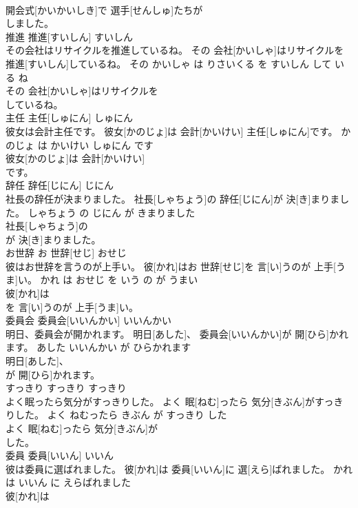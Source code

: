 \documentclass[8pt]{extreport}
\begin{document}
\begin{CJK}{UTF8}{min}
\\	開会式[かいかいしき]で 選手[せんしゅ]たちが
\\	しました。			
\\	推進	推進[すいしん]	すいしん	
\\	その会社はリサイクルを推進しているね。	その 会社[かいしゃ]はリサイクルを 推進[すいしん]しているね。	その かいしゃ は りさいくる を すいしん して いる ね	
\\	その 会社[かいしゃ]はリサイクルを
\\	しているね。			
\\	主任	主任[しゅにん]	しゅにん	
\\	彼女は会計主任です。	彼女[かのじょ]は 会計[かいけい] 主任[しゅにん]です。	かのじょ は かいけい しゅにん です	
\\	彼女[かのじょ]は 会計[かいけい]
\\	です。			
\\	辞任	辞任[じにん]	じにん	
\\	社長の辞任が決まりました。	社長[しゃちょう]の 辞任[じにん]が 決[き]まりました。	しゃちょう の じにん が きまりました	
\\	社長[しゃちょう]の
\\	が 決[き]まりました。			
\\	お世辞	お 世辞[せじ]	おせじ	
\\	彼はお世辞を言うのが上手い。	彼[かれ]はお 世辞[せじ]を 言[い]うのが 上手[うま]い。	かれ は おせじ を いう の が うまい	
\\	彼[かれ]は
\\	を 言[い]うのが 上手[うま]い。			
\\	委員会	委員会[いいんかい]	いいんかい	
\\	明日、委員会が開かれます。	明日[あした]、 委員会[いいんかい]が 開[ひら]かれます。	あした いいんかい が ひらかれます	
\\	明日[あした]、
\\	が 開[ひら]かれます。			
\\	すっきり	すっきり	すっきり	
\\	よく眠ったら気分がすっきりした。	よく 眠[ねむ]ったら 気分[きぶん]がすっきりした。	よく ねむったら きぶん が すっきり した	
\\	よく 眠[ねむ]ったら 気分[きぶん]が
\\	した。			
\\	委員	委員[いいん]	いいん	
\\	彼は委員に選ばれました。	彼[かれ]は 委員[いいん]に 選[えら]ばれました。	かれ は いいん に えらばれました	
\\	彼[かれ]は

\end{CJK}
\end{document}
